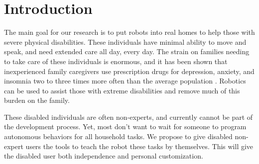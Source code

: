 \documentclass{sig-alternate-2013}
\begin{document}
\begin{abstract}

\end{abstract}


\section{Introduction}
The main goal for our research is to put robots into real homes to help those with severe physical disabilities. These
individuals have minimal ability to move and speak, and need extended care all day, every day. The strain on families needing to take care of these individuals is enormous, and it has been shown that inexperienced family caregivers use prescription drugs for depression, anxiety, and insomnia two to three times more often than the average population \cite{Gallagher01081989}. Robotics can be used to assist those with extreme disabilities and remove much of this burden on the family.

These disabled individuals are often non-experts, and currently cannot be part of the development process. Yet, most don't want to wait for someone to program autonomous behaviors for all household tasks. We propose to give disabled non-expert users the tools to teach the robot these tasks by themselves. This will give the disabled user both independence and personal customization.

\end{document}
